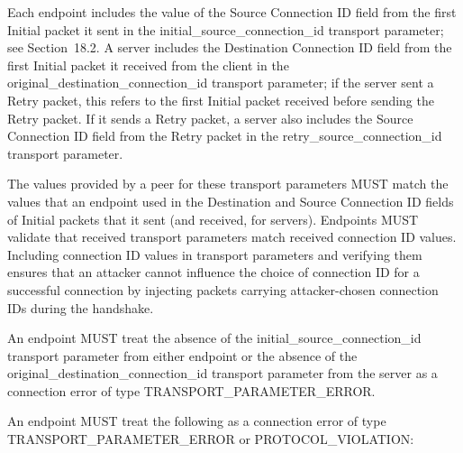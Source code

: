 \documentclass{article}
\begin{document}
Each endpoint includes the value of the Source Connection ID field from the first Initial packet it sent in the initial\_source\_connection\_id transport parameter; see Section~18.2. A server includes the Destination Connection ID field from the first Initial packet it received from the client in the original\_destination\_connection\_id transport parameter; if the server sent a Retry packet, this refers to the first Initial packet received before sending the Retry packet.  If it sends a Retry packet, a server also includes the Source Connection ID field from the Retry packet in the retry\_source\_connection\_id transport parameter.

The values provided by a peer for these transport parameters MUST match the values that an endpoint used in the Destination and Source Connection ID fields of Initial packets that it sent (and received, for servers).  Endpoints MUST validate that received transport parameters match received connection ID values.  Including connection ID values in transport parameters and verifying them ensures that an attacker cannot influence the choice of connection ID for a successful connection by injecting packets carrying attacker-chosen connection IDs during the handshake.

An endpoint MUST treat the absence of the initial\_source\_connection\_id transport parameter from either endpoint or the absence of the original\_destination\_connection\_id transport parameter from the server as a connection error of type TRANSPORT\_PARAMETER\_ERROR.

An endpoint MUST treat the following as a connection error of type TRANSPORT\_PARAMETER\_ERROR or PROTOCOL\_VIOLATION:
\end{document}
